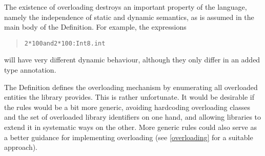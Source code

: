 \documentclass[twoside,titlepage]{article}
\begin{document}
\begin{appendix}
The existence of overloading destroys an important property of the language, namely the independence of static and dynamic semantics, as is assumed in the main body of the Definition. For example, the expressions

\begin{quote}
\begin{alltt}
2 * 100    {\rm and}    2 * 100 : Int8.int
\end{alltt}
\end{quote}

will have very different dynamic behaviour, although they only differ in an added type annotation.

The Definition defines the overloading mechanism by enumerating all overloaded entities the library provides. This is rather unfortunate. It would be desirable if the rules would be a bit more generic, avoiding hardcoding overloading classes and the set of overloaded library identifiers on one hand, and allowing libraries to extend it in systematic ways on the other. More generic rules could also serve as a better guidance for implementing overloading (see \ref{overloading} for a suitable approach).

%
%
%
%
%


\end{appendix}
\end{document}

